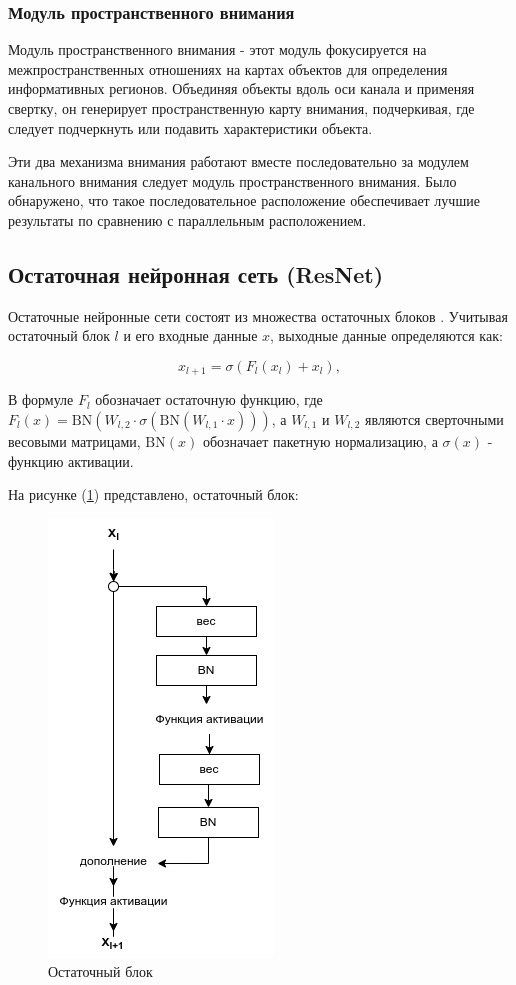 \subsubsection*{Модуль пространственного внимания}

Модуль пространственного внимания - этот модуль фокусируется на межпространственных отношениях на картах объектов для определения информативных регионов. Объединяя объекты вдоль оси канала и применяя свертку, он генерирует пространственную карту внимания, подчеркивая, где следует подчеркнуть или подавить характеристики объекта.

Эти два механизма внимания работают вместе последовательно за модулем канального внимания следует модуль пространственного внимания. Было обнаружено, что такое последовательное расположение обеспечивает лучшие результаты по сравнению с параллельным расположением.

\subsection{Остаточная нейронная сеть (ResNet)}

Остаточные нейронные сети состоят из множества остаточных блоков \cite{he2016deep}. Учитывая остаточный блок \(l\) и его входные данные \(x\), выходные данные определяются как:

\begin{equation}
    x_{l + 1} = \sigma(F_{l}(x_{l}) + x_{l})
, \end{equation}

В формуле \(F_{l}\) обозначает остаточную функцию, где \(F_{l}(x) = \text{BN}(W_{l,2} \cdot \sigma(\text{BN}(W_{l,1} \cdot x)))\), а \(W_{l,1}\) и \(W_{l,2}\) являются сверточными весовыми матрицами, \(\text{BN}(x)\) обозначает пакетную нормализацию, а \(\sigma(x)\) - функцию активации.

На рисунке (\ref{fig:residual-block}) представлено, остаточный блок: 
\begin{figure}[H]
	\centering
	\includegraphics[width=0.3\linewidth]{assets/residual-block.png}
	\caption{Остаточный блок}
	\label{fig:residual-block}
\end{figure}

